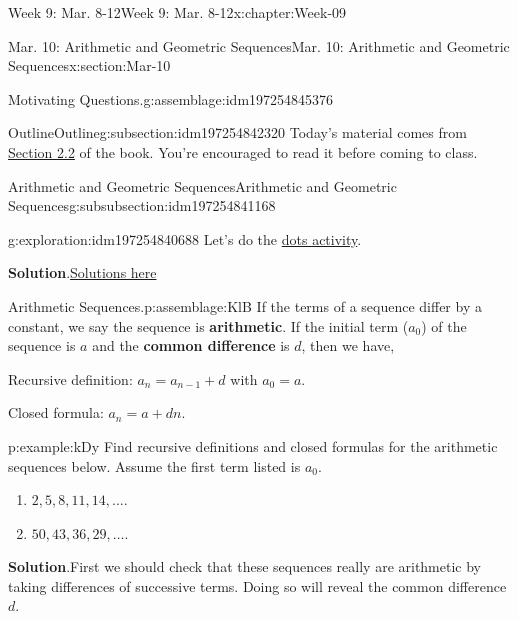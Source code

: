 \documentclass[oneside,10pt,]{book}
\newcommand{\blocktitlefont}{\relax}
\newcommand{\terminology}[1]{\textbf{#1}}
\numberwithin{equation}{section}
\begin{document}
\begin{chapterptx}{Week 9: Mar. 8-12}{}{Week 9: Mar. 8-12}{}{}{x:chapter:Week-09}
\begin{sectionptx}{Mar. 10: Arithmetic and Geometric Sequences}{}{Mar. 10: Arithmetic and Geometric Sequences}{}{}{x:section:Mar-10}
\begin{introduction}{}
\begin{assemblage}{Motivating Questions.}{g:assemblage:idm197254845376}
\begin{enumerate}
\end{enumerate}
%
\end{assemblage}
\end{introduction}%
%
%
\typeout{************************************************}
\typeout{************************************************}
%
\begin{subsectionptx}{Outline}{}{Outline}{}{}{g:subsection:idm197254842320}
Today's material comes from \href{http://discrete.openmathbooks.org/dmoi3/sec_seq-arithgeom.html}{Section 2.2} of the book. You're encouraged to read it before coming to class.%
%
%
\typeout{************************************************}
\typeout{************************************************}
%
\begin{subsubsectionptx}{Arithmetic and Geometric Sequences}{}{Arithmetic and Geometric Sequences}{}{}{g:subsubsection:idm197254841168}
\begin{exploration}{}{g:exploration:idm197254840688}%
Let's do the \href{./Activity07-DotsToSequences.pdf}{dots activity}.%
\par\smallskip%
\noindent\textbf{\blocktitlefont Solution}.\hypertarget{g:solution:idm197254839184}{}\quad{}\href{./Activity07-DotsToSequences-solutions.pdf}{Solutions here}\end{exploration}%
\begin{assemblage}{Arithmetic Sequences.}{p:assemblage:KlB}%
If the terms of a sequence differ by a constant, we say the sequence is \terminology{arithmetic}. If the initial term (\(a_0\)) of the sequence is \(a\) and the \terminology{common difference} is \(d\), then we have,%
\par
Recursive definition: \(a_n = a_{n-1} + d\) with \(a_0 = a\).%
\par
Closed formula: \(a_n = a + dn\).%
\end{assemblage}
\begin{example}{}{p:example:kDy}%
Find recursive definitions and closed formulas for the arithmetic sequences below. Assume the first term listed is \(a_0\).%
\par
%
\begin{enumerate}
\item{}\(2, 5, 8, 11, 14, \ldots\).%
\item{}\(50, 43, 36, 29, \ldots\).%
\end{enumerate}
%
\par\smallskip%
\noindent\textbf{\blocktitlefont Solution}.\hypertarget{p:solution:hIS}{}\quad{}First we should check that these sequences really are arithmetic by taking differences of successive terms. Doing so will reveal the common difference \(d\).%

\end{example}
\end{subsubsectionptx}
\end{subsectionptx}
\end{sectionptx}
\end{chapterptx}
\end{document}
